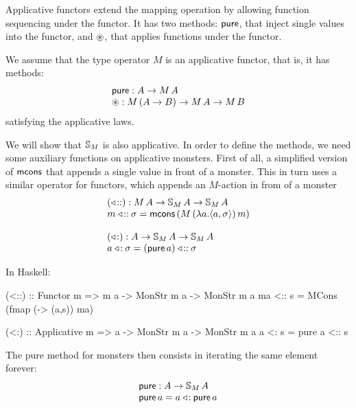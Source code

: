 Applicative functors \cite{mcbride/paterson:2008}
extend the mapping operation by allowing function sequencing under the functor.
It has two methods: $\mathsf{pure}$, that inject single values into the functor, and $\circledast$, that applies functions under the functor.

We assume that the type operator $M$ is an applicative functor, that is, it has methods:
$$
\begin{array}{l}
\mathsf{pure} : A \rightarrow M\,A\\
\circledast: M\,(A\rightarrow B) \rightarrow M\,A \rightarrow M\,B
\end{array}
$$
satisfying the applicative laws.

We will show that $\mathbb{S}_{M}$ is also applicative.
In order to define the methods, we need some auxiliary functions on applicative monsters.
First of all, a simplified version of $\mathsf{mcons}$ that appends a single value in front of a monster.
This in turn uses a similar operator for functors, which appends an $M$-action in from of a monster
$$
\begin{array}{l}
(\mathbin{\triangleleft\!::}): M\,A \rightarrow \mathbb{S}_{M}\,A \rightarrow \mathbb{S}_{M}\,A\\
m \mathbin{\triangleleft\!::} \sigma = \mathsf{mcons}\, (M\,(\lambda a. \langle a, \sigma\rangle)\,m)\\
\,\\
(\mathbin{\triangleleft\!:}): A \rightarrow \mathbb{S}_{M}\,A \rightarrow \mathbb{S}_{M}\,A\\
a \mathbin{\triangleleft\!:} \sigma = (\mathsf{pure}\, a) \mathbin{\triangleleft\!::} \sigma
\end{array}
$$

In Haskell:
\begin{haskell}
(<::) :: Functor m => m a -> MonStr m a -> MonStr m a
ma <:: s = MCons (fmap (\a -> (a,s)) ma)

(<:) :: Applicative m => a -> MonStr m a -> MonStr m a
a <: s = pure a <:: s
\end{haskell}

The pure method for monsters then consists in iterating the same element forever:
$$
\begin{array}{l}
\mathsf{pure} : A \rightarrow \mathbb{S}_{M}\,A\\
\mathsf{pure}\,a = a \mathbin{\triangleleft\!:} \mathsf{pure}\,a
\end{array}
$$

